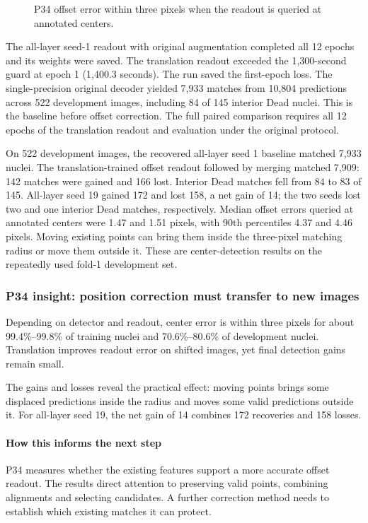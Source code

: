 \documentclass[
  12pt,
]{article}
\begin{document}
\begin{figure}[H]\centering\caption{P34 offset error within three pixels when the readout is queried at annotated centers.}\end{figure}
The all-layer seed-1 readout with original augmentation completed all 12 epochs and its weights were saved. The translation readout exceeded the 1,300-second guard at epoch 1 (1,400.3 seconds). The run saved the first-epoch loss. The single-precision original decoder yielded 7,933 matches from 10,804 predictions across 522 development images, including 84 of 145 interior Dead nuclei. This is the baseline before offset correction. The full paired comparison requires all 12 epochs of the translation readout and evaluation under the original protocol.

On 522 development images, the recovered all-layer seed 1 baseline matched 7,933 nuclei. The translation-trained offset readout followed by merging matched 7,909: 142 matches were gained and 166 lost. Interior Dead matches fell from 84 to 83 of 145. All-layer seed 19 gained 172 and lost 158, a net gain of 14; the two seeds lost two and one interior Dead matches, respectively. Median offset errors queried at annotated centers were 1.47 and 1.51 pixels, with 90th percentiles 4.37 and 4.46 pixels. Moving existing points can bring them inside the three-pixel matching radius or move them outside it. These are center-detection results on the repeatedly used fold-1 development set.

\subsubsection{P34 insight: position correction must transfer to new images}\label{chapter15}
Depending on detector and readout, center error is within three pixels for about 99.4\%–99.8\% of training nuclei and 70.6\%–80.6\% of development nuclei. Translation improves readout error on shifted images, yet final detection gains remain small.

The gains and losses reveal the practical effect: moving points brings some displaced predictions inside the radius and moves some valid predictions outside it. For all-layer seed 19, the net gain of 14 combines 172 recoveries and 158 losses.

\paragraph{How this informs the next step}
P34 measures whether the existing features support a more accurate offset readout. The results direct attention to preserving valid points, combining alignments and selecting candidates. A further correction method needs to establish which existing matches it can protect.
\end{document}
